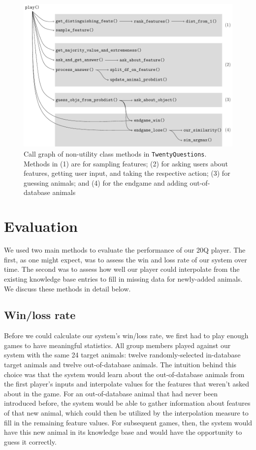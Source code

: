 \documentclass[11pt,a4paper]{article}
\begin{document}
\begin{figure}
\centering
	\includegraphics[width=.9\linewidth]{graphics/call_graph.pdf}
	\caption{Call graph of non-utility class methods in \texttt{TwentyQuestions}. Methods in (1) are for sampling features; (2) for asking users about features, getting user input, and taking the respective action; (3) for guessing animals; and (4) for the endgame and adding out-of-database animals}
	\label{fig:call-graph}
\end{figure}

\section{Evaluation}
\label{sec:eval}

We used two main methods to evaluate the performance of our 20Q player. The first, as one might expect, was to assess the win and loss rate of our system over time. The second was to assess how well our player could interpolate from the existing knowledge base entries to fill in missing data for newly-added animals. We discuss these methods in detail below.

\subsection{Win/loss rate}

Before we could calculate our system's win/loss rate, we first had to play enough games to have meaningful statistics. 
All group members played against our system with the same 24 target animals: twelve randomly-selected in-database target animals and twelve out-of-database animals. 
The intuition behind this choice was that the system would learn about the out-of-database animals from the first player's inputs and interpolate values for the features that weren't asked about in the game. 
For an out-of-database animal that had never been introduced before, the system would be able to gather information about features of that new animal, which could then be utilized by the interpolation measure to fill in the remaining feature values. 
For subsequent games, then, the system would have this new animal in its knowledge base and would have the opportunity to guess it correctly. 
\end{document}
